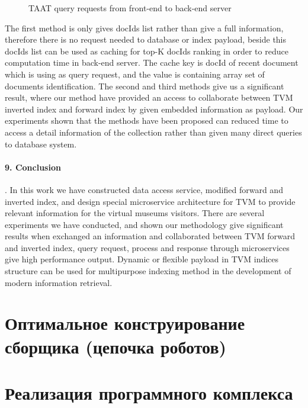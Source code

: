 \begin{figure}[ht]
	\caption{TAAT query requests from front-end to back-end server}\label{fig:taatQuery}
\end{figure}

The first method is only gives docIds list rather than give a full information, therefore there is no request needed to database or index payload, beside this docIds list can be used as caching for top-K docIds ranking in order to reduce computation time in back-end server. The cache key is docId of recent document which is using as query request, and the value is containing array set of documents identification. The second and third methods give us a significant result, where our method have provided an access to collaborate between TVM inverted index and forward index by given embedded information as payload. Our experiments shown that the methods have been proposed can reduced time to access a detail information of the collection rather than given many direct queries to database system.

\paragraph{9. Conclusion}. In this work we have constructed data access service, modified forward and inverted index, and design special microservice architecture for TVM to provide relevant information for the virtual museums visitors. There are several experiments we have conducted, and shown our methodology give significant results when exchanged an information and collaborated between TVM forward and inverted index, query request, process and response through microservices give high performance output. Dynamic or flexible payload in TVM indices structure can be used for multipurpose indexing method in the development of modern information retrieval.


\section{Оптимальное конструирование сборщика (цепочка роботов)}\label{sec:ch4/sect3}

\section{Реализация программного комплекса}\label{sec:ch4/sect4}

\FloatBarrier

